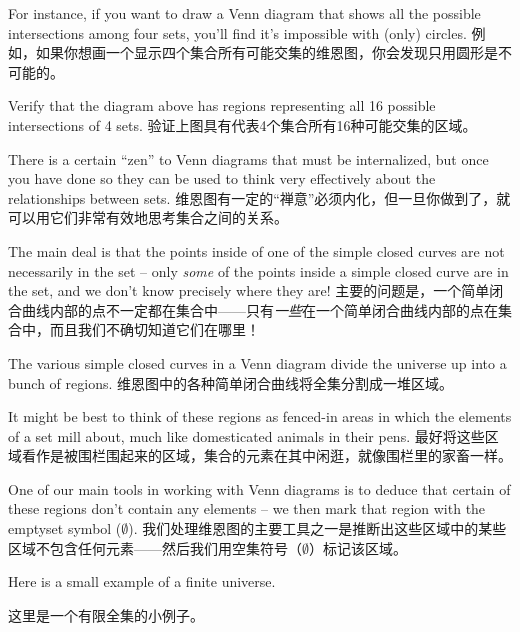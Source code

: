 For instance, if you
want to draw a Venn diagram that shows all the possible intersections
among four sets, you'll find it's impossible with (only) circles.
例如，如果你想画一个显示四个集合所有可能交集的维恩图，你会发现只用圆形是不可能的。
\vspace{.1in}



\vspace{.1in}

\begin{exer}
Verify that the diagram above has regions representing all 16 possible
intersections of 4 sets.
验证上图具有代表4个集合所有16种可能交集的区域。
\end{exer}

There is a certain ``zen'' to Venn diagrams that must be internalized,
but once you have done so they can be used to think very effectively
about the relationships between sets.
维恩图有一定的“禅意”必须内化，但一旦你做到了，就可以用它们非常有效地思考集合之间的关系。

The main deal is that the points
inside of one of the simple closed curves are not necessarily in the set --
only \emph{some} of the points inside a simple closed curve are in the
set, and we don't know precisely where they are!
主要的问题是，一个简单闭合曲线内部的点不一定都在集合中——只有\emph{一些}在一个简单闭合曲线内部的点在集合中，而且我们不确切知道它们在哪里！

The various simple closed 
curves in a Venn diagram divide the universe up into a bunch of regions.
维恩图中的各种简单闭合曲线将全集分割成一堆区域。

It might be best to think of these regions as fenced-in areas in which
the elements of a set mill about, much like domesticated animals 
in their pens.
最好将这些区域看作是被围栏围起来的区域，集合的元素在其中闲逛，就像围栏里的家畜一样。

One of our main tools in working with Venn diagrams is to deduce that
certain of these regions don't contain any elements -- we then mark that
region with the emptyset symbol ($\emptyset$).
我们处理维恩图的主要工具之一是推断出这些区域中的某些区域不包含任何元素——然后我们用空集符号（$\emptyset$）标记该区域。

Here is a small example of a finite universe.

这里是一个有限全集的小例子。

\vspace{.1in}



